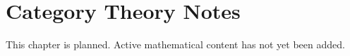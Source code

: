 
\section*{Category Theory Notes}
This chapter is planned. Active mathematical content has not yet been added.
